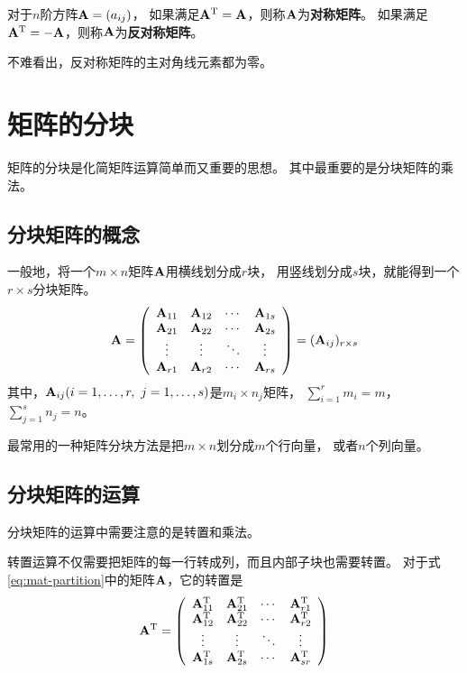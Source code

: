 \begin{definition}[对称矩阵与反对称矩阵]
  对于$n$阶方阵$\mmA=(a_{ij})$，
  如果满足$\mmA^\mT=\mmA$，则称$\mmA$为\textbf{对称矩阵}。
  如果满足$\mmA^\mT=-\mmA$，则称$\mmA$为\textbf{反对称矩阵}。
\end{definition}

\begin{remark}
  不难看出，反对称矩阵的主对角线元素都为零。
\end{remark}

\section{矩阵的分块}
矩阵的分块是化简矩阵运算简单而又重要的思想。
其中最重要的是分块矩阵的乘法。

\subsection{分块矩阵的概念}
\begin{definition}[分块矩阵]
  一般地，将一个$m\times n$矩阵$\mmA$用横线划分成$r$块，
  用竖线划分成$s$块，就能得到一个$r\times s$分块矩阵。
  \begin{equation} \label{eq:mat-partition}
  \mmA = \mmat{cccc}{
    \mmA_{11} & \mmA_{12} & \cdots & \mmA_{1s} \\
    \mmA_{21} & \mmA_{22} & \cdots & \mmA_{2s} \\
    \vdots    & \vdots    & \ddots & \vdots    \\
    \mmA_{r1} & \mmA_{r2} & \cdots & \mmA_{rs} }
    = (\mmA_{ij})_{r\times s}
  \end{equation}
  其中，$\mmA_{ij}(i=1,\dots,r,\ j=1,\dots,s)$是$m_i\times n_j$矩阵，
  $\sum_{i=1}^{r}m_i = m$，$\sum_{j=1}^{s}n_j=n$。
\end{definition}

最常用的一种矩阵分块方法是把$m\times n$划分成$m$个行向量，
或者$n$个列向量。

\subsection{分块矩阵的运算}
分块矩阵的运算中需要注意的是转置和乘法。

转置运算不仅需要把矩阵的每一行转成列，而且内部子块也需要转置。
对于式\ref{eq:mat-partition}中的矩阵$\mmA$，它的转置是
\[
  \mmA^\mT = \mmat{cccc}{
    \mmA_{11}^\mT & \mmA_{21}^\mT & \cdots & \mmA_{r1}^\mT \\
    \mmA_{12}^\mT & \mmA_{22}^\mT & \cdots & \mmA_{r2}^\mT \\
    \vdots        & \vdots        & \ddots & \vdots        \\
    \mmA_{1s}^\mT & \mmA_{2s}^\mT & \cdots & \mmA_{sr}^\mT }
\]

